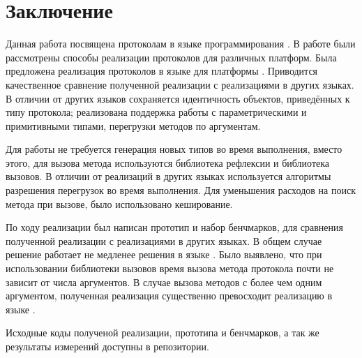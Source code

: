 \section*{Заключение}
Данная работа посвящена протоколам в языке программирования . В работе были рассмотрены способы реализации протоколов для различных платформ. Была предложена реализация протоколов в языке  для платформы . Приводится качественное сравнение полученной реализации с реализациями в других языках. В отличии от других языков сохраняется идентичность объектов, приведённых к типу протокола; реализована поддержка работы с параметрическими и примитивными типами, перегрузки методов по аргументам.

Для работы не требуется генерация новых типов во время выполнения, вместо этого, для вызова метода используются библиотека рефлексии и библиотека вызовов. В отличии от реализаций в других языках используется алгоритмы разрешения перегрузок во время выполнения. Для уменьшения расходов на поиск метода при вызове, было использовано кеширование.

По ходу реализации был написан прототип и набор бенчмарков, для сравнения полученной реализации с реализациями в других языках. В общем случае решение работает не медленее решения в языке . Было выявлено, что при использовании библиотеки вызовов время вызова метода протокола почти не зависит от числа аргументов. В случае вызова методов с более чем одним аргументом, полученная реализация существенно превосходит реализацию в языке .

Исходные коды полученой реализации, прототипа и бенчмарков, а так же результаты измерений доступны в репозитории\cite{repo}.
